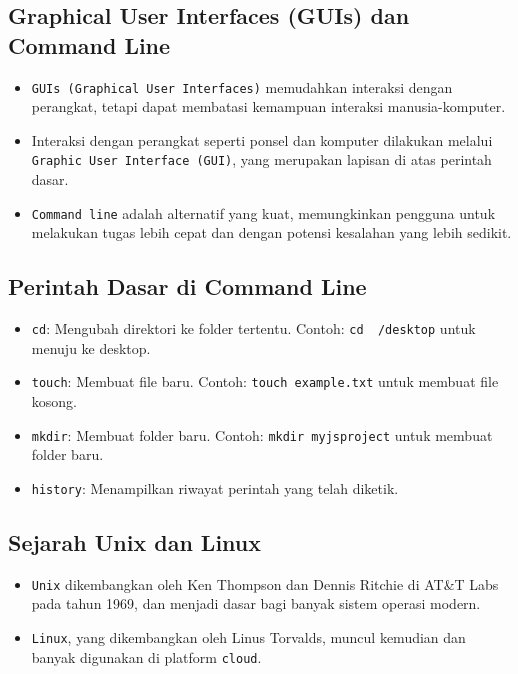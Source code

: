 \documentclass{article}
\begin{document}
\subsection{Graphical User Interfaces (GUIs) dan Command Line}
\begin{itemize}
    \item \texttt{GUIs (Graphical User Interfaces)} memudahkan interaksi dengan perangkat, tetapi dapat membatasi kemampuan interaksi manusia-komputer.
    \item Interaksi dengan perangkat seperti ponsel dan komputer dilakukan melalui \texttt{Graphic User Interface (GUI)}, yang merupakan lapisan di atas perintah dasar.
    \item \texttt{Command line} adalah alternatif yang kuat, memungkinkan pengguna untuk melakukan tugas lebih cepat dan dengan potensi kesalahan yang lebih sedikit.
\end{itemize}

\subsection{Perintah Dasar di Command Line}
\begin{itemize}
    \item \texttt{cd}: Mengubah direktori ke folder tertentu. Contoh: \texttt{cd ~/desktop} untuk menuju ke desktop.
    \item \texttt{touch}: Membuat file baru. Contoh: \texttt{touch example.txt} untuk membuat file kosong.
    \item \texttt{mkdir}: Membuat folder baru. Contoh: \texttt{mkdir myjsproject} untuk membuat folder baru.
    \item \texttt{history}: Menampilkan riwayat perintah yang telah diketik.
\end{itemize}

\subsection{Sejarah Unix dan Linux}
\begin{itemize}
    \item \texttt{Unix} dikembangkan oleh Ken Thompson dan Dennis Ritchie di AT\&T Labs pada tahun 1969, dan menjadi dasar bagi banyak sistem operasi modern.
    \item \texttt{Linux}, yang dikembangkan oleh Linus Torvalds, muncul kemudian dan banyak digunakan di platform \texttt{cloud}.
\end{itemize}
\end{document}
